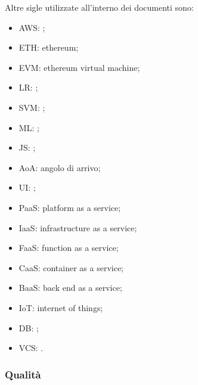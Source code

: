 				Altre sigle utilizzate all'interno dei documenti sono:
				\begin{itemize}
					\item AWS: ;
					\item ETH: ethereum;
					\item EVM: ethereum virtual machine;
					\item LR: ;
					\item SVM: ;
					\item ML: ;
					\item JS: ;
					\item AoA: angolo di arrivo;
					\item UI: ;
					\item PaaS: platform as a service;
					\item IaaS: infrastructure as a service;
					\item FaaS: function as a service;
					\item CaaS: container as a service;
					\item BaaS: back end as a service;
					\item IoT: internet of things;
					\item DB: ;
					\item VCS: .
				\end{itemize}
		\subsubsection{Qualità}
